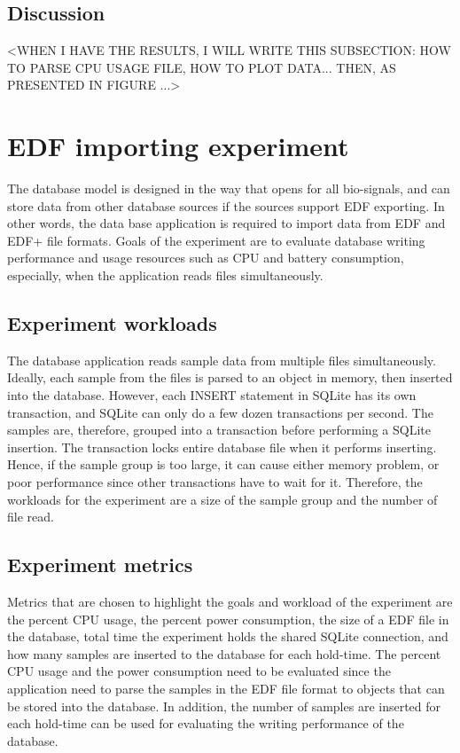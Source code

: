 \subsection{Discussion}
<WHEN I HAVE THE RESULTS, I WILL WRITE THIS SUBSECTION: HOW TO PARSE CPU USAGE FILE, HOW TO PLOT DATA... THEN, AS PRESENTED IN FIGURE ...>
\section{EDF importing experiment}
The database model is designed in the way that opens for all bio-signals, and can store data from other database sources if the sources support EDF exporting. In other words, the data base application is required to import data from EDF and EDF+ file formats. Goals of the experiment are to evaluate database writing performance and usage resources such as CPU and battery consumption, especially, when the application reads files simultaneously.
\subsection{Experiment workloads}
The database application reads sample data from multiple files simultaneously. Ideally, each sample from the files is parsed to an object in memory, then inserted into the database. However, each INSERT statement in SQLite has its own transaction, and SQLite can only do a few dozen transactions per second. The samples are, therefore, grouped into a transaction before performing a SQLite insertion. The transaction locks entire database file when it performs inserting. Hence, if the sample group is too large, it can cause either memory problem, or poor performance since other transactions have to wait for it. Therefore, the workloads for the experiment are a size of the sample group and the number of file read.
\subsection{Experiment metrics}
Metrics that are chosen to highlight the goals and workload of the experiment are the percent CPU usage, the percent power consumption, the size of a EDF file in the database, total time the experiment holds the shared SQLite connection, and how many samples are inserted to the database for each hold-time. The percent CPU usage and the power consumption need to be evaluated since the application need to parse the samples in the EDF file format to objects that can be stored into the database. In addition, the number of samples are inserted for each hold-time can be used for evaluating the writing performance of the database.
